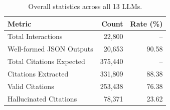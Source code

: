 \begin{table}[t]
  \centering
  \begin{threeparttable}
    \caption{Overall statistics across all 13 LLMs.}
    \label{tab:overall_stats}
    \small
{}
\begin{tabular}{lrr}
\toprule
\textbf{Metric} & \textbf{Count} & \textbf{Rate (\%)} \\
\midrule
Total Interactions & 22,800 & -- \\
Well-formed JSON Outputs & 20,653 & 90.58 \\
Total Citations Expected & 375,440 & -- \\
Citations Extracted & 331,809 & 88.38 \\
Valid Citations & 253,438 & 76.38 \\
Hallucinated Citations & 78,371 & 23.62 \\
\bottomrule
\end{tabular}
  \end{threeparttable}
\end{table}

